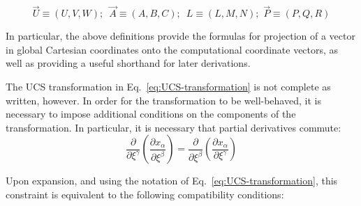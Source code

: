 \[\vec U \equiv \left( {U,V,W} \right);\,\,\,\vec A \equiv \left( {A,B,C} \right);\,\,\,L \equiv \left( {L,M,N} \right);\,\,\vec P \equiv \left( {P,Q,R} \right)\]

In particular, the above definitions provide the formulas for projection of a vector in global Cartesian coordinates onto the computational coordinate vectors, as well as providing a useful shorthand for later derivations.

The UCS transformation in Eq.~\ref{eq:UCS-transformation} is not complete as written, however. In order for the transformation to be well-behaved, it is necessary to impose additional conditions on the components of the transformation. In particular, it is necessary that partial derivatives commute:
\[\frac{\partial }{{\partial {\xi ^\gamma }}}\left( {\frac{{\partial {x_\alpha }}}{{\partial {\xi ^\beta }}}} \right) = \frac{\partial }{{\partial {\xi ^\beta }}}\left( {\frac{{\partial {x_\alpha }}}{{\partial {\xi ^\gamma }}}} \right)\]

Upon expansion, and using the notation of Eq.~\ref{eq:UCS-transformation}, this constraint is equivalent to the following compatibility conditions:

